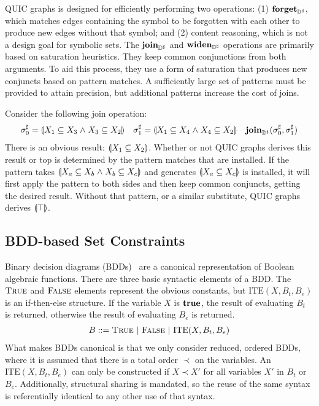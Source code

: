 QUIC graphs is designed for efficiently performing two operations:
(1) $\textbf{forget}_{{\mathbb{D}}^{\sharp}}$, which matches edges containing the symbol to be
forgotten with each other to produce new edges without that symbol; and
(2) content reasoning, which is not a design goal for symbolic sets.
The $\textbf{join}_{{\mathbb{D}}^{\sharp}}$ and $\textbf{widen}_{{\mathbb{D}}^{\sharp}}$ operations are primarily based on
saturation heuristics.
They keep common conjunctions from both arguments.
To aid this process, they use a form of saturation that produces new
conjuncts based on pattern matches.
A sufficiently large set of patterns must be provided to attain precision,
but additional patterns increase the cost of joins.
\begin{example} \label{ex:Qjoin}  Consider the following join operation:
    \begin{align*}
      {\sigma}^{\sharp}_0 &= \llparenthesis X_1 \subseteq X_3 \mathrel{\wedge} X_3 \subseteq X_2 \rrparenthesis &
      {\sigma}^{\sharp}_1 &= \llparenthesis X_1 \subseteq X_4 \mathrel{\wedge} X_4 \subseteq X_2 \rrparenthesis &
      \textbf{join}_{{\mathbb{D}}^{\sharp}}({\sigma}^{\sharp}_0, {\sigma}^{\sharp}_1 )
    \end{align*}
    There is an obvious result: $\llparenthesis X_1 \subseteq X_2 \rrparenthesis$.  Whether or not QUIC graphs derives this result or top is determined by the pattern matches that are installed.  If the pattern takes $\llparenthesis X_a \subseteq X_b \mathrel{\wedge} X_b \subseteq X_c \rrparenthesis$ and generates $\llparenthesis X_a \subseteq X_c \rrparenthesis$ is installed, it will first apply the pattern to both sides and then keep common conjuncts, getting the desired result.  Without that pattern, or a similar substitute, QUIC graphs derives $\llparenthesis \top \rrparenthesis$.
\end{example}

\subsection{BDD-based Set Constraints}
\label{s:4:3:bdd}
Binary decision diagrams (BDDs)~\cite{bdd:trans:86} are a canonical representation of Boolean algebraic functions.  There are three basic syntactic elements of a BDD.  The $\textsc{True}$ and $\textsc{False}$ elements represent the obvious constants, but $\textrm{ITE}(X,B_t,B_e)$ is an if-then-else structure.  If the variable $X$ is $\mathbf{true}$, the result of evaluating $B_t$ is returned, otherwise the result of evaluating $B_e$ is returned.
\begin{align*}
  B ::= \textsc{True} \ | \ \textsc{False} \ | \ \textrm{ITE}(X,B_t,B_e)
\end{align*}
What makes BDDs canonical is that we only consider reduced, ordered BDDs, where it is assumed that there is a total order $\prec$ on the variables.  An $\textrm{ITE}(X,B_t,B_e)$ can only be constructed if $X \prec X'$ for all variables $X'$ in $B_t$ or $B_e$.  Additionally, structural sharing is mandated, so the reuse of the same syntax is referentially identical to any other use of that syntax.

